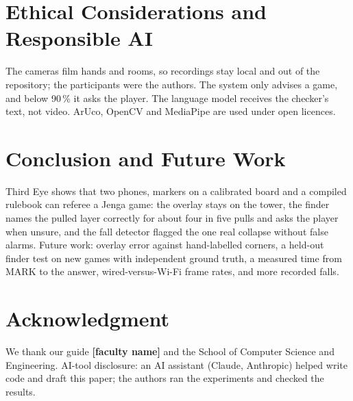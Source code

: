 \documentclass[12pt,a4paper]{article}
\newcommand{\tbd}[1]{\textbf{[#1]}}
\begin{document}
\section{Ethical Considerations and Responsible AI}
The cameras film hands and rooms, so recordings stay local and out of the repository; the participants were the authors. The system only advises a game, and below 90\,\% it asks the player. The language model receives the checker's text, not video. ArUco, OpenCV and MediaPipe are used under open licences.

\section{Conclusion and Future Work}
Third Eye shows that two phones, markers on a calibrated board and a compiled rulebook can referee a Jenga game: the overlay stays on the tower, the finder names the pulled layer correctly for about four in five pulls and asks the player when unsure, and the fall detector flagged the one real collapse without false alarms. Future work: overlay error against hand-labelled corners, a held-out finder test on new games with independent ground truth, a measured time from MARK to the answer, wired-versus-Wi-Fi frame rates, and more recorded falls.

\section*{Acknowledgment}
We thank our guide \tbd{faculty name} and the School of Computer Science and Engineering. AI-tool disclosure: an AI assistant (Claude, Anthropic) helped write code and draft this paper; the authors ran the experiments and checked the results.
\end{document}
